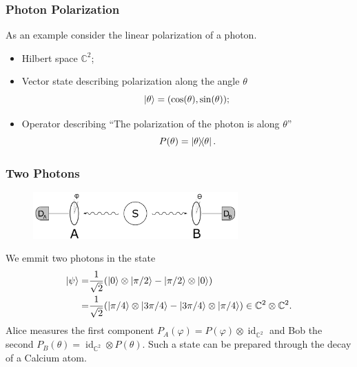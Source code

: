 \documentclass{beamer}
\DeclareMathOperator{\id}{id}
\begin{document}
\begin{frame}

	\frametitle{Photon Polarization}

	As an example consider the linear polarization of a photon.
	
	\begin{itemize}
	
		\item Hilbert space $\mathbb{C}^2$;
		\item Vector state describing polarization along the angle $\theta$ 
		\begin{equation}
			\ket{\theta}=(\cos(\theta),\sin(\theta));
		\end{equation}
		\item Operator describing ``The polarization of the photon is along $\theta$''
		\begin{equation}
			P(\theta)=\dyad{\theta}.
		\end{equation}
	
	\end{itemize}

\end{frame}

\begin{frame}

	\frametitle{Two Photons}
	
	\begin{figure}
		\includegraphics[width=0.7\textwidth]{bell_experiment.png}
	\end{figure}		
	
	We emmit two photons in the state
	\begin{align}
	\begin{split}
		\ket{\psi}=&\frac{1}{\sqrt{2}}(\ket{0}\otimes\ket{\pi/2}-\ket{\pi/2}\otimes\ket{0})\\
		=&\frac{1}{\sqrt{2}}(\ket{\pi/4}\otimes\ket{3\pi/4}-\ket{3\pi/4}\otimes\ket{\pi/4})\in\mathbb{C}^2\otimes\mathbb{C}^2.
	\end{split}
	\end{align}
	Alice measures the first component $P_A(\varphi)=P(\varphi)\otimes\id_{\mathbb{C}^2}$ and Bob the second $P_B(\theta)=\id_{\mathbb{C}^2}\otimes P(\theta)$. Such a state can be prepared through the decay of a Calcium atom\cite{Reyes2013}.

\end{frame}
\end{document}
